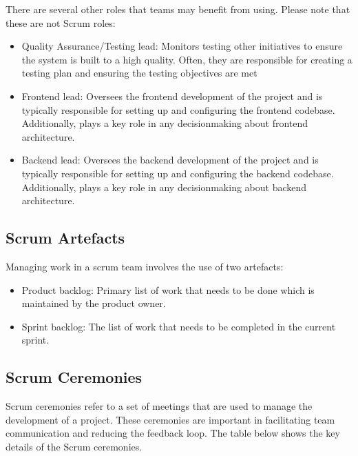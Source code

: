 \documentclass[letterpaper,10pt,english]{jupyterBook}
\begin{document}
\sphinxAtStartPar
{}

\sphinxAtStartPar
{} 

\sphinxAtStartPar
There are several other roles that teams may benefit from using. Please
note that these are not Scrum roles:
\begin{itemize}
\item {} 
\sphinxAtStartPar
Quality Assurance/Testing lead: Monitors testing other initiatives
to ensure the system is built to a high quality. Often, they are
responsible for creating a testing plan and ensuring the testing
objectives are met

\item {} 
\sphinxAtStartPar
Frontend lead: Oversees the frontend development of the project and
is typically responsible for setting up and configuring the frontend
codebase. Additionally, plays a key role in any decision\sphinxhyphen{}making
about frontend architecture.

\item {} 
\sphinxAtStartPar
Backend lead: Oversees the backend development of the project and is
typically responsible for setting up and configuring the backend
codebase. Additionally, plays a key role in any decision\sphinxhyphen{}making
about backend architecture.

\end{itemize}


\subsection{Scrum Artefacts}
\label{\detokenize{chapter_1/agile_methodology:scrum-artefacts}}
\sphinxAtStartPar
Managing work in a scrum team involves the use of two artefacts:
\begin{itemize}
\item {} 
\sphinxAtStartPar
Product backlog: Primary list of work that needs to be done which is
maintained by the product owner.

\item {} 
\sphinxAtStartPar
Sprint backlog: The list of work that needs to be completed in the
current sprint.

\end{itemize}


\subsection{Scrum Ceremonies}
\label{\detokenize{chapter_1/agile_methodology:scrum-ceremonies}}
\sphinxAtStartPar
Scrum ceremonies refer to a set of meetings that are used to manage the
development of a project. These ceremonies are important in facilitating
team communication and reducing the feedback loop. The table below shows
the key details of the Scrum ceremonies.
\end{document}
